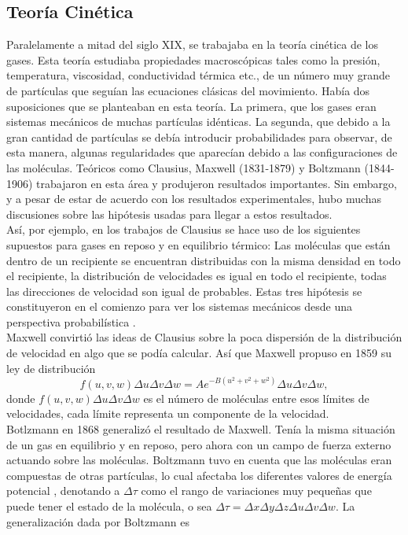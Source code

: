 \subsection{Teoría Cinética}
Paralelamente a mitad del siglo XIX, se trabajaba en la teoría cinética de los gases. Esta teoría estudiaba propiedades macroscópicas tales como la presión, temperatura, viscosidad, conductividad térmica etc., de un número muy grande de partículas que seguían las ecuaciones clásicas del movimiento. Había dos suposiciones que se planteaban en esta teoría. La primera, que los gases eran sistemas mecánicos de muchas partículas idénticas. La segunda, que debido a la gran cantidad de partículas se debía introducir probabilidades para observar, de esta manera, algunas regularidades que aparecían debido a las configuraciones de las moléculas. Teóricos como Clausius, Maxwell (1831-1879) y Boltzmann (1844-1906) trabajaron en esta área y produjeron resultados importantes. Sin	 embargo, y a pesar de estar de acuerdo con los resultados experimentales, hubo muchas discusiones sobre las hipótesis usadas para llegar a estos resultados.
\\
Así, por ejemplo, en los trabajos de Clausius se hace uso de los siguientes supuestos para gases en reposo y en equilibrio térmico: Las moléculas que están dentro de un recipiente se encuentran distribuidas con la misma densidad en todo el recipiente, la distribución de velocidades es igual en todo el recipiente, todas las direcciones de velocidad son igual de probables. Estas tres hipótesis se constituyeron en el comienzo para ver los sistemas mecánicos desde una perspectiva probabilística \cite{Ehrenfest}.
\\
Maxwell convirtió las ideas de Clausius sobre la poca dispersión de la distribución de velocidad en algo que se podía calcular. Así que Maxwell propuso en 1859 su ley de distribución
\begin{equation}
f(u,v,w) \Delta u \Delta v \Delta w = A e^{-B(u^{2}+v^{2}+w^{2})}  \Delta u \Delta v \Delta w,
\end{equation}
donde $f(u,v,w) \Delta u \Delta v \Delta w $ es el número de moléculas entre esos límites de velocidades, cada límite representa un componente de la velocidad.
\\
Botlzmann en 1868 generalizó el resultado de Maxwell. Tenía la misma situación de un gas en equilibrio y en reposo, pero ahora con un campo de fuerza externo actuando sobre las moléculas. Boltzmann tuvo en cuenta que las moléculas eran compuestas de otras partículas, lo cual afectaba los diferentes valores de energía potencial  \cite{Ehrenfest}, denotando a $\Delta \tau$ como el rango de variaciones muy pequeñas que puede tener el estado de la molécula, o sea $\Delta \tau= \Delta x \Delta y \Delta z \Delta u \Delta v \Delta w$. La generalización dada por Boltzmann es
